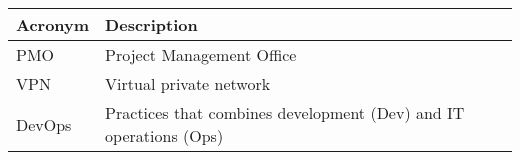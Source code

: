 \addtocounter{table}{-1}
\begin{longtable}{p{}p{}}\hline
\textbf{Acronym} & \textbf{Description}  \\\hline

PMO & Project Management Office \\\hline
VPN & Virtual private network \\\hline
DevOps & Practices that combines development (Dev) and IT operations (Ops) \\\hline

\end{longtable}
